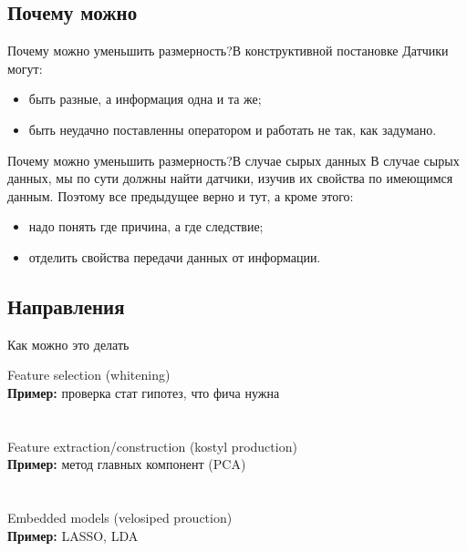 \documentclass[14pt, fleqn, xcolor={dvipsnames, table}]{beamer}
\begin{document}
\subsection{Почему можно} %
\begin{frame}{Почему можно уменьшить размерность?}{В конструктивной постановке}
Датчики могут:
\begin{itemize}
  \item быть разные, а информация одна и та же;
  \item быть неудачно поставленны оператором и работать не так, как задумано.
\end{itemize}
\end{frame}

\begin{frame}{Почему можно уменьшить размерность?}{В случае сырых данных}
В случае сырых данных, мы по сути должны найти датчики, изучив их свойства по имеющимся данным. Поэтому все предыдущее верно и тут, а кроме этого:
\begin{itemize}
  \item надо понять где причина, а где следствие;
  \item отделить свойства передачи данных от информации.
\end{itemize}
\end{frame}

\subsection{Направления}
\begin{frame}{Как можно это делать}{}

{\color{blue}Feature selection (whitening)} \\
\textbf{Пример:} проверка стат гипотез, что фича нужна \\
 \\
~\\
{\color{blue}Feature extraction/construction (kostyl production)} \\
\textbf{Пример:} метод главных компонент (PCA) \\
 \\
~\\
{\color{blue}Embedded models (velosiped prouction)}\\
\textbf{Пример:} LASSO, LDA \\
\end{frame}
\end{document}
